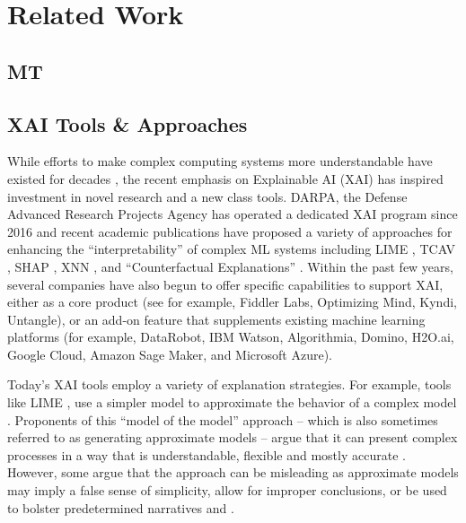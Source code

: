 \section{Related Work}


\subsection{MT} 

\subsection{XAI Tools \& Approaches}
While efforts to make complex computing systems more understandable have existed for decades \cite{MillerHoweInmates2017}, the recent emphasis on Explainable AI (XAI) has inspired investment in novel research and a new class tools. DARPA, the Defense Advanced Research Projects Agency has operated a dedicated XAI program since 2016 \cite{DARPAXAI} and recent academic publications have proposed a variety of approaches for enhancing the “interpretability” of complex ML systems including LIME \cite{RiberoLIME2016}, TCAV \cite{KimTCAV2018}, SHAP \cite{LundbergLeeSHAP2017}, XNN \cite{vaughanXNN2018}, and “Counterfactual Explanations” \cite{WachterCounterfactual2017}. Within the past few years, several companies have also begun to offer specific capabilities to support XAI, either as a core product (see for example, Fiddler Labs, Optimizing Mind, Kyndi, Untangle), or an add-on feature that supplements existing machine learning platforms (for example, DataRobot, IBM Watson, Algorithmia, Domino, H2O.ai, Google Cloud, Amazon Sage Maker, and Microsoft Azure). 

Today’s XAI tools employ a variety of explanation strategies. For example, tools like LIME \cite{RiberoLIME2016}, use a simpler model to approximate the behavior of a complex model \cite{SelbstBarocasIntuitive2018}. Proponents of this “model of the model” \cite{SelbstBarocasIntuitive2018} approach – which is also sometimes referred to as generating approximate models – argue that it can present complex processes in a way that is understandable, flexible and mostly accurate \cite{MittelstadtRussellExplain2019}. However, some argue that the approach can be misleading \cite{rudin2018stop} as approximate models may imply a false sense of simplicity, allow for improper conclusions, or be used to bolster predetermined narratives \cite{MittelstadtRussellExplain2019} and \cite{herman2017promise}. 

